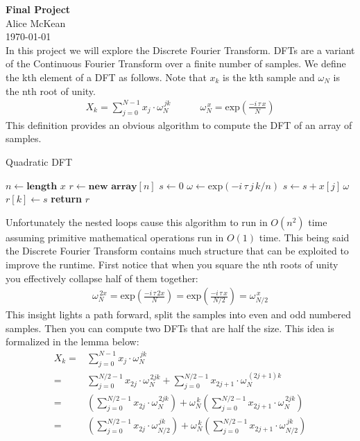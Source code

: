 \documentclass[fleqn]{article}
\newcommand{\expF}[1]{\ensuremath{\text{exp}\left(#1\right)}}
\begin{document}
\noindent\Large\textbf{Final Project} \\
\normalsize
Alice McKean \\
\today \\

In this project we will explore the Discrete Fourier Transform. DFTs are a variant of the
Continuous Fourier Transform over a finite number of samples. We define the kth
element of a DFT as follows. Note that $x_k$ is the kth sample and $\omega_{N}$
is the nth root of unity.
\begin{align*}
  X_k = \sum_{j = 0}^{N - 1} x_j \cdot \omega_N^{\, j k} \hspace{3em}
  \omega_{N}^{\, x} = \expF{\frac{- i \, \tau \, x}{N}}
\end{align*}
This definition provides an obvious algorithm to compute the DFT of an array of
samples.
\begin{algorithm}[H]
  \caption{Quadratic DFT}\label{euclid}
  \begin{algorithmic}
    \State $n \leftarrow \textbf{length } x$
    \State $r \leftarrow \textbf{new array}[n]$
      \State $s \leftarrow 0$
        \State $\omega \leftarrow \expF{- i \, \tau \, j \, k / n}$
        \State $s \leftarrow s + x[j] \, \omega$
      \EndFor
      \State $r[k] \leftarrow s$
    \EndFor
    \State \textbf{return} $r$
    \EndFunction
  \end{algorithmic}
\end{algorithm}
Unfortunately the nested loops cause this algorithm to run in $O(n^2)$ time
assuming primitive mathematical operations run in $O(1)$ time. This being said the Discrete
Fourier Transform contains much structure that can be exploited to improve the
runtime. First notice that when you square the nth roots of unity you
effectively collapse half of them together:
\begin{align*}
  \omega_{N}^{\, 2 x}
  = \expF{\frac{- i \, \tau \, 2 x}{N}}
  = \expF{\frac{- i \, \tau \, x}{N / 2}}
  = \omega_{N / 2}^{\, x}
\end{align*}
This insight lights a path forward, split the samples into even and odd numbered
samples. Then you can compute two DFTs that are half the size. This idea is
formalized in the lemma below:
\begin{align*}
  X_k =& \sum_{j = 0}^{N - 1} x_j \cdot \omega_N^{\, j k} \\
      =& \sum_{j = 0}^{N / 2 - 1} x_{2 j} \cdot \omega_N^{\, 2 j k}
       + \sum_{j = 0}^{N / 2 - 1} x_{2 j + 1} \cdot \omega_N^{\, \left( 2 j + 1 \right) k} \\
      =& \left( \sum_{j = 0}^{N / 2 - 1} x_{2 j} \cdot \omega_N^{\, 2 j k} \right)
       + \omega_N^{\, k} \left( \sum_{j = 0}^{N / 2 - 1} x_{2 j + 1} \cdot \omega_N^{\, 2 j k} \right) \\
      =& \left( \sum_{j = 0}^{N / 2 - 1} x_{2 j} \cdot \omega_{N / 2}^{\, j k} \right)
       + \omega_N^{\, k} \left( \sum_{j = 0}^{N / 2 - 1} x_{2 j + 1} \cdot \omega_{N / 2}^{\, j k} \right)
\end{align*}
\end{document}
